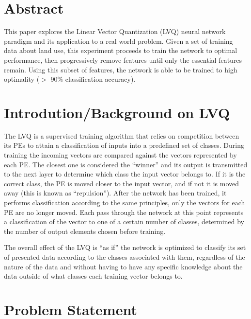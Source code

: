 \documentclass[12pt]{article}
\begin{document}
\maketitle

\section{Abstract}

This paper explores the Linear Vector Quantization (LVQ) neural network paradigm and its application to a real world problem.  Given a set of training data about land use, this experiment proceeds to train the network to optimal performance, then progressively remove features until only the essential features remain.  Using this subset of features, the network is able to be trained to high optimality ($>$ 90\% classification accuracy).  

\section{Introdution/Background on LVQ}

The LVQ is a supervised training algorithm that relies on competition between its PEs to attain a classification of inputs into a predefined set of classes.  During training the incoming vectors are compared against the vectors represented by each PE.  The closest one is considered the ``winner'' and its output is transmitted to the next layer to determine which class the input vector belongs to.  If it is the correct class, the PE is moved closer to the input vector, and if not it is moved away (this is known as ``repulsion'').  After the network has been trained, it performs classification according to the same principles, only the vectors for each PE are no longer moved.  Each pass through the network at this point represents a classification of the vector to one of a certain number of classes, determined by the number of output elements chosen before training.  

The overall effect of the LVQ is ``as if'' the network is optimized to classify its set of presented data according to the classes associated with them, regardless of the nature of the data and without having to have any specific knowledge about the data outside of what classes each training vector belongs to.  

\section{Problem Statement}
\end{document}
